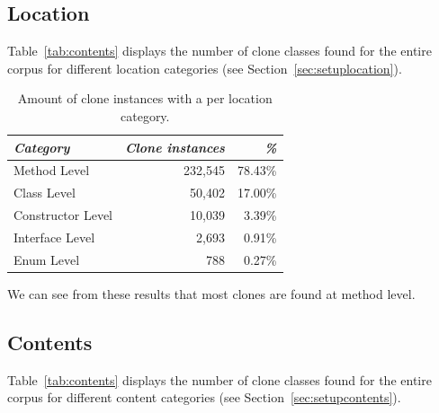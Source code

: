 \subsection{Location}
Table~\ref{tab:contents} displays the number of clone classes found for the entire corpus for different location categories (see Section~\ref{sec:setuplocation}).
\begin{table}[H]
\centering
\begin{tabular}{@{}lrr@{}}
\toprule
\textit{\textbf{Category}} & \textit{\textbf{Clone instances}} & \textit{\textbf{\%}} \\ \midrule
Method Level & 232,545 & 78.43\% \\
Class Level & 50,402 & 17.00\% \\
Constructor Level & 10,039 & 3.39\% \\
Interface Level & 2,693 & 0.91\% \\
Enum Level & 788 & 0.27\% \\
\end{tabular}
\caption{Amount of clone instances with a per location category.}
\label{tab:location}
\end{table}

We can see from these results that most clones are found at method level.

\subsection{Contents}
Table~\ref{tab:contents} displays the number of clone classes found for the entire corpus for different content categories (see Section~\ref{sec:setupcontents}).


